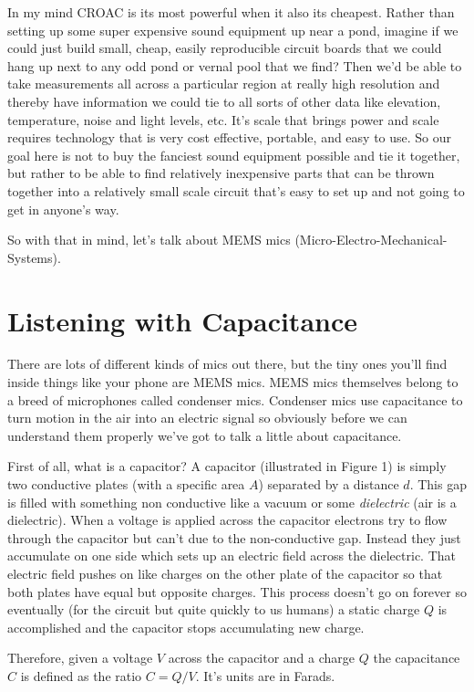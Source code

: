 \documentclass[12pt,a6paper]{book}
\begin{document}
In my mind CROAC is its most powerful when it also its cheapest. Rather than setting up some super expensive sound equipment up near a pond, imagine if we could just build small, cheap, easily reproducible circuit boards that we could hang up next to any odd pond or vernal pool that we find? Then we'd be able to take measurements all across a particular region at really high resolution and thereby have information we could tie to all sorts of other data like elevation, temperature, noise and light levels, etc. It's scale that brings power and scale requires technology that is very cost effective, portable, and easy to use. So our goal here is not to buy the fanciest sound equipment possible and tie it together, but rather to be able to find relatively inexpensive parts that can be thrown together into a relatively small scale circuit that's easy to set up and not going to get in anyone's way. 

So with that in mind, let's talk about MEMS mics (Micro-Electro-Mechanical-Systems).
\section{Listening with Capacitance}
There are lots of different kinds of mics out there, but the tiny ones you'll find inside things like your phone are MEMS mics. MEMS mics themselves belong to a breed of microphones called condenser mics. Condenser mics use capacitance to turn motion in the air into an electric signal so obviously before we can understand them properly we've got to talk a little about capacitance. 

First of all, what is a capacitor? A capacitor (illustrated in Figure 1) is simply two conductive plates (with a specific area $A$) separated by a distance $d$. This gap is filled with something non conductive like a vacuum or some \textit{dielectric} (air is a dielectric). When a voltage is applied across the capacitor electrons try to flow through the capacitor but can't due to the non-conductive gap. Instead they just accumulate on one side which sets up an electric field across the dielectric. That electric field pushes on like charges on the other plate of the capacitor so that both plates have equal but opposite charges. This process doesn't go on forever so eventually (for the circuit but quite quickly to us humans) a static charge $Q$ is accomplished and the capacitor stops accumulating new charge. 

Therefore, given a voltage $V$ across the capacitor and a charge $Q$ the capacitance $C$ is defined as the ratio $C=Q/V$. It's units are in Farads. 
\end{document}

